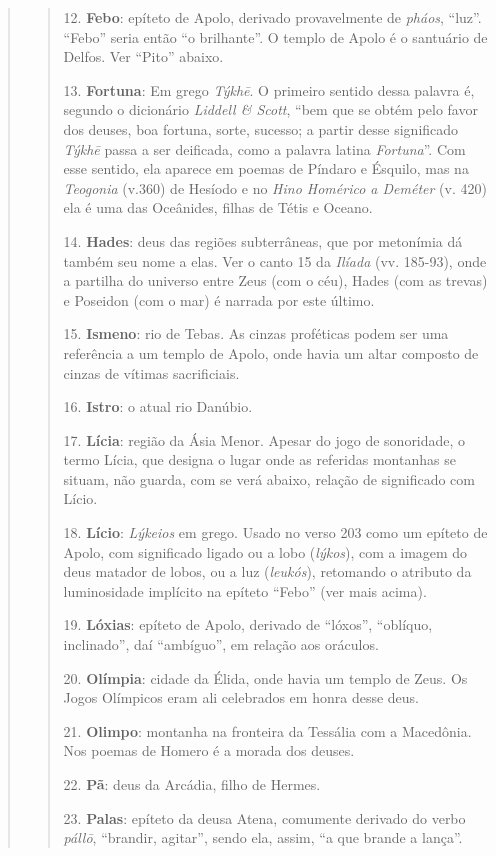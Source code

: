 \begin{verse}
\begin{verse}
12. \textbf{Febo}: epíteto de Apolo, derivado provavelmente de
\emph{pháos}, ``luz''. ``Febo'' seria então ``o brilhante''. O templo de
Apolo é o santuário de Delfos. Ver ``Pito'' abaixo.

13. \textbf{Fortuna}: Em grego \emph{Týkhē}. O primeiro sentido dessa
palavra é, segundo o dicionário \emph{Liddell \& Scott}, ``bem que se
obtém pelo favor dos deuses, boa fortuna, sorte, sucesso; a partir desse
significado \emph{Týkhē} passa a ser deificada, como a palavra latina
\emph{Fortuna}''. Com esse sentido, ela aparece em poemas de Píndaro e
Ésquilo, mas na \emph{Teogonia} (v.360) de Hesíodo e no \emph{Hino
Homérico a Deméter} (v. 420) ela é uma das Oceânides, filhas de Tétis e
Oceano.

14. \textbf{Hades}: deus das regiões subterrâneas, que por metonímia dá
também seu nome a elas. Ver o canto 15 da \emph{Ilíada} (vv. 185-93),
onde a partilha do universo entre Zeus (com o céu), Hades (com as
trevas) e Poseidon (com o mar) é narrada por este último.

15. \textbf{Ismeno}: rio de Tebas. As cinzas proféticas podem ser uma
referência a um templo de Apolo, onde havia um altar composto de cinzas
de vítimas sacrificiais.

16. \textbf{Istro}: o atual rio Danúbio.

17. \textbf{Lícia}: região da Ásia Menor. Apesar do jogo de sonoridade,
o termo Lícia, que designa o lugar onde as referidas montanhas se
situam, não guarda, com se verá abaixo, relação de significado com
Lício.

18. \textbf{Lício}: \emph{Lýkeios} em grego. Usado no verso 203 como um
epíteto de Apolo, com significado ligado ou a lobo (\emph{lýkos}), com a
imagem do deus matador de lobos, ou a luz (\emph{leukós}), retomando o
atributo da luminosidade implícito na epíteto ``Febo'' (ver mais acima).

19. \textbf{Lóxias}: epíteto de Apolo, derivado de ``lóxos'', ``oblíquo,
inclinado'', daí ``ambíguo'', em relação aos oráculos.

20. \textbf{Olímpia}: cidade da Élida, onde havia um templo de Zeus. Os
Jogos Olímpicos eram ali celebrados em honra desse deus.

21. \textbf{Olimpo}: montanha na fronteira da Tessália com a Macedônia.
Nos poemas de Homero é a morada dos deuses.

22. \textbf{Pã}: deus da Arcádia, filho de Hermes.

23. \textbf{Palas}: epíteto da deusa Atena, comumente derivado do verbo
\emph{pállō}, ``brandir, agitar'', sendo ela, assim, ``a que brande a
lança''.


\end{verse}
\end{verse}
